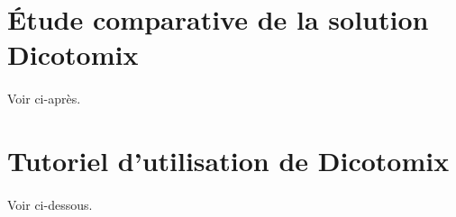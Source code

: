 \documentclass[11pt,a4paper]{article}
\theoremstyle{plain}
\theoremstyle{definition}
\begin{document}
\section{Étude comparative de la solution Dicotomix}
\paragraph{} Voir ci-après.
\section{Tutoriel d'utilisation de Dicotomix}
\paragraph{} Voir ci-dessous.



\end{document}
